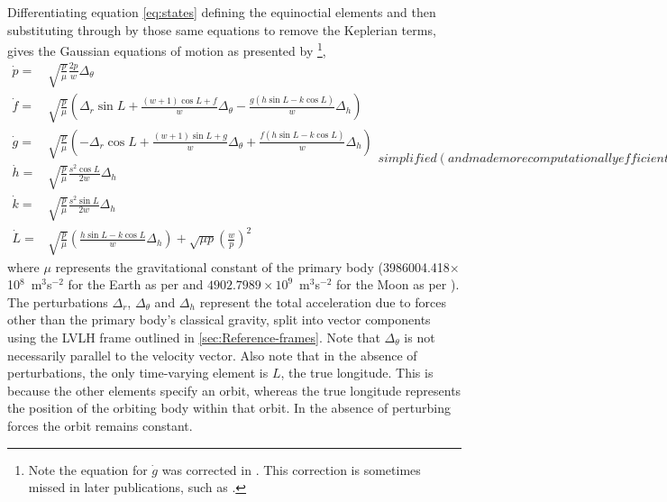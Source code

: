 Differentiating equation \eqref{eq:states} defining the equinoctial elements and then substituting through by those same equations to remove the Keplerian terms, gives the Gaussian equations of motion as presented by \textcite{Walker1985,Walker1986,Keppeler_thesis,Erb_thesis,Letterio_thesis,Hintz2008} \footnote{Note the equation for $\dot{g}$ was corrected in \textcite{Walker1986}. This correction is sometimes missed in later publications, such as \textcite{Hintz2008}.},
\begin{subequations}\label{eq:state-updates}
\begin{eqnarray}
\dot{p} = & \sqrt{\frac{p}{\mu}}\frac{2p}{w}\Delta_\theta \label{eq:pdot}\\
\dot{f} = & \sqrt{\frac{p}{\mu}}\left(\Delta_r\sin L+\frac{\left(w+1\right)\cos L+f}{w}\Delta_\theta-\frac{g\left(h\sin L-k\cos L\right)}{w}\Delta_h \right) \label{eq:fdot}\\
\dot{g} = & \sqrt{\frac{p}{\mu}}\left(-\Delta_r\cos L+\frac{\left(w+1\right)\sin L+g}{w}\Delta_\theta+\frac{f\left(h\sin L-k\cos L\right)}{w}\Delta_h \right) \label{eq:gdot}\\
\dot{h} = & \sqrt{\frac{p}{\mu}}\frac{s^{2}\cos L}{2w}\Delta_h \label{eq:hdot}\\
\dot{k} = & \sqrt{\frac{p}{\mu}}\frac{s^{2}\sin L}{2w}\Delta_h \label{eq:kdot}\\
\dot{L} = & \sqrt{\frac{p}{\mu}}\left(\frac{h\sin L-k\cos L}{w}\Delta_h \right)+\sqrt{\mu p}\left(\frac{w}{p}\right)^{2} \label{eq:Ldot}
\end{eqnarray}
simplified (and made more computationally efficient) using the terms
\begin{eqnarray}
w & = & 1+f\cos L+g\sin L\label{eq:w_helper}\\
s^{2} & = & 1+h^{2}+k^{2}\label{eq:s2_helper}
\end{eqnarray}
\end{subequations}
where $\mu$ represents the gravitational constant of the primary body \linebreak (3986004.418$\times$10$^8$~m$^3$s$^{-2}$ for the Earth as per \cite{WGS84} and  $4902.7989\times10^9$~m$^3$s$^{-2}$ for the Moon as per \cite{Zhang1994}). The perturbations $\Delta_r$, $\Delta_\theta$ and $\Delta_h$ represent the total acceleration due to forces other than the primary body's classical gravity, split into vector components using the LVLH frame outlined in \autoref{sec:Reference-frames}. Note that $\Delta_\theta$ is not necessarily parallel to the velocity vector. Also note that in the absence of perturbations, the only time-varying element is $L$, the true longitude. This is because the other elements specify an orbit, whereas the true longitude represents the position of the orbiting body within that orbit. In the absence of perturbing forces the orbit remains constant.




